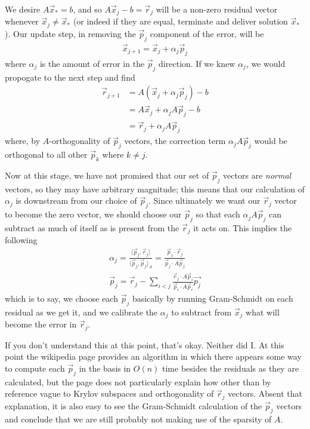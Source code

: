 \documentclass[11pt]{article}
\begin{document}
We desire $A\vec{x}_* = b$, and so $A\vec{x}_j - b = \vec{r}_j$ will be a non-zero residual vector whenever $\vec{x}_j \neq \vec{x}_*$ (or indeed if they are equal, terminate and deliver solution $\vec{x}_*$). Our update step, in removing the $\vec{p}_j$ component of the error, will be \begin{gather*}
\vec{x}_{j+1} = \vec{x}_j + \alpha_j \vec p_j
\end{gather*}
where $\alpha_j$ is the amount of error in the $\vec{p}_j$ direction. If we knew $\alpha_j$, we would propogate to the next step and find \begin{align*}
\vec r_{j+1} &= A(\vec x_j + \alpha_j \vec p_j) - b \\
&= A\vec x_j + \alpha_j A\vec p_j - b \\
&= \vec r_j + \alpha_j A\vec p_j
\end{align*}
where, by $A$-orthogonality of $\vec{p}_j$ vectors, the correction term $\alpha_j A \vec p_j$ would be orthogonal to all other $\vec{p}_k$ where $k \neq j$.

Now at this stage, we have not promised that our set of $\vec{p}_j$ vectors are \emph{normal} vectors, so they may have arbitrary magnitude; this means that our calculation of $\alpha_j$ is downstream from our choice of $\vec{p}_j$. Since ultimately we want our $\vec{r}_j$ vector to become the zero vector, we should choose our $\vec{p}_j$ so that each $\alpha_j A \vec{p}_j$ can subtract as much of itself as is present from the $\vec{r}_j$ it acts on. This implies the following \begin{gather*}
\alpha_j = \frac{\langle \vec p_j, \vec r_j \rangle}{\langle \vec p_j, \vec p_j \rangle _A } = \frac{\vec p_j \cdot \vec r_j }{\vec p_j \cdot A \vec p_j } \\
\vec p_j = \vec r_j - \sum_{i < j} \frac{\vec r_j \cdot A \vec p_i}{\vec p_i \cdot A \vec p_i} \vec{p_j}
\end{gather*}
which is to say, we choose each $\vec p_j$ basically by running Gram-Schmidt on each residual as we get it, and we calibrate the $\alpha_j$ to subtract from $\vec x_{j}$ what will become the error in $\vec r_j$.

If you don't understand this at this point, that's okay. Neither did I. At this point the wikipedia page provides an algorithm in which there appears some way to compute each $\vec p_j$ in the basis in $O(n)$ time besides the residuals as they are calculated, but the page does not particularly explain how other than by reference vague to Krylov subspaces and orthogonality of $\vec r_j$ vectors. Absent that explanation, it is also easy to see the Gram-Schmidt calculation of the $\vec p_j$ vectors and conclude that we are still probably not making use of the sparsity of $A$.
\end{document}
